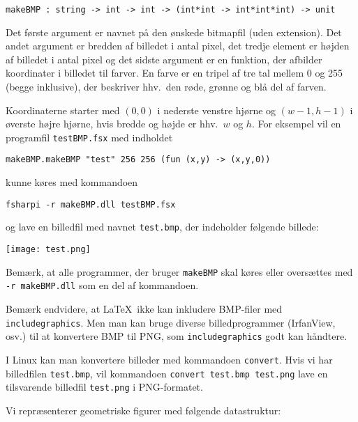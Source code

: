 \documentclass[a4paper]{article}
\begin{document}
\begin{verbatim}
makeBMP : string -> int -> int -> (int*int -> int*int*int) -> unit
\end{verbatim}

\noindent
Det første argument er navnet på den ønskede bitmapfil (uden
extension).  Det andet argument er bredden af billedet i antal pixel,
det tredje element er højden af billedet i antal pixel og det sidste
argument er en funktion, der afbilder koordinater i billedet til
farver.  En farve er en tripel af tre tal mellem 0 og 255 (begge
inklusive), der beskriver hhv.\ den røde, grønne og blå del af farven.

Koordinaterne starter med $(0,0)$ i nederste venstre hjørne og
$(w-1,h-1)$ i øverste højre hjørne, hvis bredde og højde er hhv.\ $w$
og $h$.  For eksempel vil en programfil \texttt{testBMP.fsx} med
indholdet

\begin{verbatim}
makeBMP.makeBMP "test" 256 256 (fun (x,y) -> (x,y,0))
\end{verbatim}

\noindent
kunne køres med kommandoen

\begin{verbatim}
fsharpi -r makeBMP.dll testBMP.fsx 
\end{verbatim}

\noindent
og lave en billedfil med navnet \texttt{test.bmp}, der indeholder
følgende billede:

\begin{center}
\texttt{[image: test.png]}
\end{center}

\noindent
Bemærk, at alle programmer, der bruger \texttt{makeBMP} skal køres
eller oversættes med \texttt{-r makeBMP.dll} som en del af kommandoen.

Bemærk endvidere, at \LaTeX\ ikke kan inkludere BMP-filer med
\texttt{includegraphics}.  Men man kan bruge diverse billedprogrammer
(IrfanView, osv.) til at konvertere BMP til PNG, som
\texttt{includegraphics} godt kan håndtere.

I Linux kan man konvertere billeder med kommandoen \texttt{convert}.
Hvis vi har billedfilen \texttt{test.bmp}, vil kommandoen
\texttt{convert~test.bmp~test.png} lave en tilsvarende billedfil
\texttt{test.png} i PNG-formatet.

\vspace{2ex}

\noindent
Vi repræsenterer geometriske figurer med følgende datastruktur:
\end{document}
